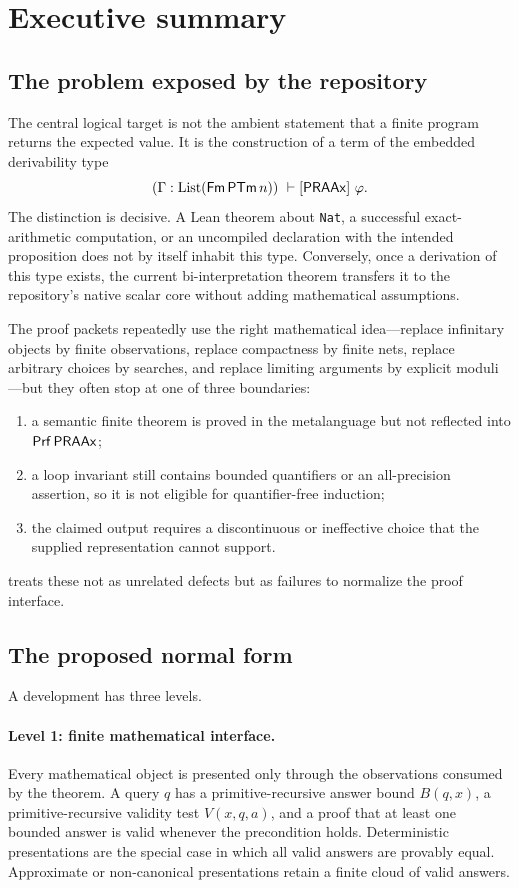 \section{Executive summary}

\subsection{The problem exposed by the repository}

The central logical target is not the ambient statement that a finite program returns the expected value.  It is the construction of a term of the embedded derivability type
\[
  (\Gamma : \operatorname{List}(\mathsf{Fm}\,\mathsf{PTm}\,n))\ \vdash[\mathsf{PRAAx}]\ \varphi.
\]
The distinction is decisive.  A Lean theorem about \texttt{Nat}, a successful exact-arithmetic computation, or an uncompiled declaration with the intended proposition does not by itself inhabit this type.  Conversely, once a derivation of this type exists, the current bi-interpretation theorem transfers it to the repository's native scalar core without adding mathematical assumptions.

The proof packets repeatedly use the right mathematical idea---replace infinitary objects by finite observations, replace compactness by finite nets, replace arbitrary choices by searches, and replace limiting arguments by explicit moduli---but they often stop at one of three boundaries:
\begin{enumerate}[label=(\roman*)]
  \item a semantic finite theorem is proved in the metalanguage but not reflected into \(\mathsf{Prf}\,\mathsf{PRAAx}\);
  \item a loop invariant still contains bounded quantifiers or an all-precision assertion, so it is not eligible for quantifier-free induction;
  \item the claimed output requires a discontinuous or ineffective choice that the supplied representation cannot support.
\end{enumerate}
\KIFC treats these not as unrelated defects but as failures to normalize the proof interface.

\subsection{The proposed normal form}

A \KIFC development has three levels.

\paragraph{Level 1: finite mathematical interface.}
Every mathematical object is presented only through the observations consumed by the theorem.  A query \(q\) has a primitive-recursive answer bound \(B(q,x)\), a primitive-recursive validity test \(V(x,q,a)\), and a proof that at least one bounded answer is valid whenever the precondition holds.  Deterministic presentations are the special case in which all valid answers are provably equal.  Approximate or non-canonical presentations retain a finite cloud of valid answers.

